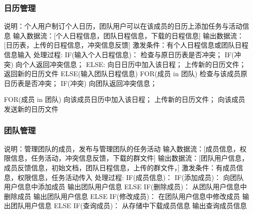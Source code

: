             \subsubsection{日历管理}
                说明：个人用户制订个人日历，团队用户可以在该成员的日历上添加任务与活动信息
                输入数据流：[个人日程信息，团队日程信息，下载的日程信息]
                输出数据流：[日历表，上传的日程信息，冲突信息反馈]
                激发条件：有个人日程信息或团队日程信息输入
                处理过程:   
                IF(输入个人日程信息)：
                    检查与原日历表是否冲突；
                    IF(冲突) 向个人返回冲突信息；
                    ELSE:
                        向日日历中加入该日程；
                        上传新的日历文件；
                        返回新的日历文件
                ELSE(输入团队日程信息)
                    FOR(成员 in 团队)
                        检查与该成员原日历表是否冲突；
                        IF(冲突) 向团队返回冲突信息；
                    
                    FOR(成员 in 团队)
                        向该成员日历中加入该日程；
                        上传新的日历文件；
                        向该成员发送新的日历文件
            \subsubsection{团队管理}
                说明：管理团队的成员，发布与管理团队的任务活动
                输入数据流：[成员信息，权限信息，任务活动，冲突信息反馈，下载的群文件]
                输出数据流：[团队用户信息，成员反馈信息，初始文档，团队日程信息，上传的群文件，]
                激发条件：有成员信息，权限信息，任务活动传入
                处理过程:   
                IF(成员信息)：
                    IF(添加成员)：
                        向团队用户信息中添加成员
                        输出团队用户信息
                    ELSE IF(删除成员)：
                        从团队用户信息中删除成员
                        输出团队用户信息
                    ELSE IF(修改成员)：
                        在团队用户信息中修改成员
                        输出团队用户信息
                    ELSE IF(查询成员)：
                        从存储中下载成员信息
                        输出查询成员信息
